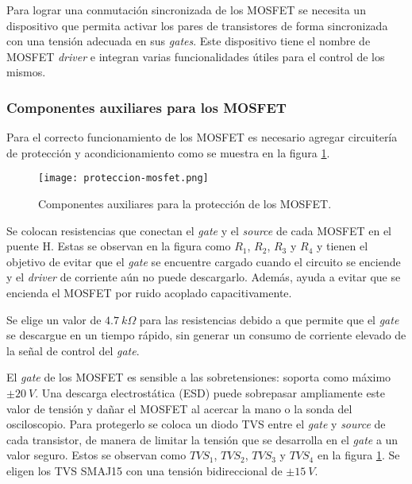 Para lograr una conmutación sincronizada de los MOSFET se necesita un dispositivo que permita activar los pares de transistores de forma sincronizada con una tensión adecuada en sus \textsl{gates}. Este dispositivo tiene el nombre de MOSFET \textsl{driver} e integran varias funcionalidades útiles para el control de los mismos. 

\subsubsection{Componentes auxiliares para los MOSFET} \label{sec_auxiliares_mosfet}


Para el correcto funcionamiento de los MOSFET es necesario agregar circuitería de protección y acondicionamiento como se muestra en la figura \ref{fig:img_capacitores-puenteH}.


\begin{figure}[H]
	\centering
	\texttt{[image: proteccion-mosfet.png]}
	\caption{Componentes auxiliares para la protección de los MOSFET.}
	\label{fig:img_capacitores-puenteH}
\end{figure}

\label{sec_res-gate}

\noindent Se colocan resistencias que conectan el \textsl{gate} y el \textsl{source} de cada MOSFET en el puente H. Estas se observan en la figura como $R_1$, $R_2$, $R_3$ y $R_4$ y tienen el objetivo de evitar que el \textsl{gate} se encuentre cargado cuando el circuito se enciende y el \textsl{driver} de corriente aún no puede descargarlo. Además, ayuda a evitar que se encienda el MOSFET por ruido acoplado capacitivamente. 

\noindent Se elige un valor de $4.7 \:k\Omega$  para las resistencias debido a que permite que el \textsl{gate} se descargue en un tiempo rápido, sin generar un consumo de corriente elevado de la señal de control del \textsl{gate}.


\noindent El \textsl{gate} de los MOSFET es sensible a las sobretensiones: soporta como máximo $\pm 20\:V$. Una descarga electrostática (ESD) puede sobrepasar ampliamente este valor de tensión y dañar el MOSFET al acercar la mano o la sonda del osciloscopio. Para protegerlo se coloca un diodo TVS entre el \textsl{gate} y \textsl{source} de cada transistor, de manera de limitar la tensión que se desarrolla en el \textsl{gate} a un valor seguro. Estos se observan como $TVS_1$, $TVS_2$, $TVS_3$ y $TVS_4$ en la figura \ref{fig:img_capacitores-puenteH}. Se eligen los TVS SMAJ15 \cite{SMAJ15} con una tensión bidireccional de $\pm 15\:V$.

